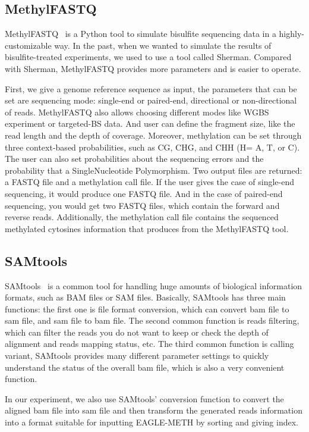 \documentclass{PHlab-thesis}
\begin{document}
\subsection{MethylFASTQ}
MethylFASTQ~\cite{piaggeschi2019methylfastq} is a Python tool to simulate bisulfite sequencing data in a highly-customizable way. In the past, when we wanted to simulate the results of bisulfite-treated experiments, we used to use a tool called Sherman. Compared with Sherman, MethylFASTQ provides more parameters and is easier to operate.
\par First, we give a genome reference sequence as input, the parameters that can be set are sequencing mode: single-end or paired-end, directional or non-directional of reads. MethylFASTQ also allows choosing different modes like WGBS experiment or targeted-BS data. And user can define the fragment size, like the read length and the depth of coverage. Moreover, methylation can be set through three context-based probabilities, such as CG, CHG, and CHH (H= A, T, or C). The user can also set probabilities about the sequencing errors and the probability that a SingleNucleotide Polymorphism. Two output files are returned: a FASTQ file and a methylation call file. If the user gives the case of single-end sequencing, it would produce one FASTQ file. And in the case of paired-end sequencing, you would get two FASTQ files, which contain the forward and reverse reads. Additionally, the methylation call file contains the sequenced methylated cytosines information that produces from the MethylFASTQ tool. 
\subsection{SAMtools}
SAMtools~\cite{li2009sequence} is a common tool for handling huge amounts of biological information formats, such as BAM files or SAM files.
Basically, SAMtools has three main functions: the first one is file format conversion, which can convert bam file to sam file, and sam file to bam file. The second common function is reads filtering, which can filter the reads you do not want to keep or check the depth of alignment and reads mapping status, etc. The third common function is calling variant, SAMtools provides many different parameter settings to quickly understand the status of the overall bam file, which is also a very convenient function.
\par In our experiment, we also use SAMtools' conversion function to convert the aligned bam file into sam file and then transform the generated reads information into a format suitable for inputting EAGLE-METH by sorting and giving index.
\end{document}
